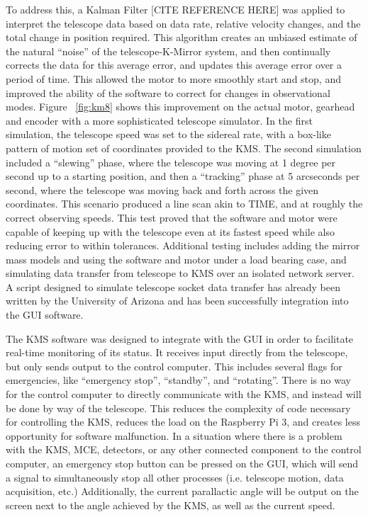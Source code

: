 \documentclass[manuscript]{aastex}
\begin{document}
To address this, a Kalman Filter [CITE REFERENCE HERE] was applied to interpret the telescope data based on data rate, relative velocity changes, and the total change in position required. This algorithm creates an unbiased estimate of the natural ``noise'' of the telescope-K-Mirror system, and then continually corrects the data for this average error, and updates this average error over a period of time. This allowed the motor to more smoothly start and stop, and improved the ability of the software to correct for changes in observational modes. Figure ~\ref{fig:km8} shows this improvement on the actual motor, gearhead and encoder with a more sophisticated telescope simulator. In the first simulation, the telescope speed was set to the sidereal rate, with a box-like pattern of motion set of coordinates provided to the KMS. The second simulation included a ``slewing'' phase, where the telescope was moving at 1 degree per second up to a starting position, and then a ``tracking'' phase at 5 arcseconds per second, where the telescope was moving back and forth across the given coordinates. This scenario produced a line scan akin to TIME, and at roughly the correct observing speeds. This test proved that the software and motor were capable of keeping up with the telescope even at its fastest speed while also reducing error to within tolerances.  Additional testing includes adding the mirror mass models and using the software and motor under a load bearing case, and simulating data transfer from telescope to KMS over an isolated network server. A script designed to simulate telescope socket data transfer has already been written by the University of Arizona and has been successfully integration into the GUI software. 

The KMS software was designed to integrate with the GUI in order to facilitate real-time monitoring of its status. It receives input directly from the telescope, but only sends output to the control computer. This includes several flags for emergencies, like ``emergency stop'', ``standby'', and ``rotating''. There is no way for the control computer to directly communicate with the KMS, and instead will be done by way of the telescope. This reduces the complexity of code necessary for controlling the KMS, reduces the load on the Raspberry Pi 3, and creates less opportunity for software malfunction. In a situation where there is a problem with the KMS, MCE, detectors, or any other connected component to the control computer, an emergency stop button can be pressed on the GUI, which will send a signal to simultaneously stop all other processes (i.e. telescope motion, data acquisition, etc.) Additionally, the current parallactic angle will be output on the screen next to the angle achieved by the KMS, as well as the current speed.
\end{document}
